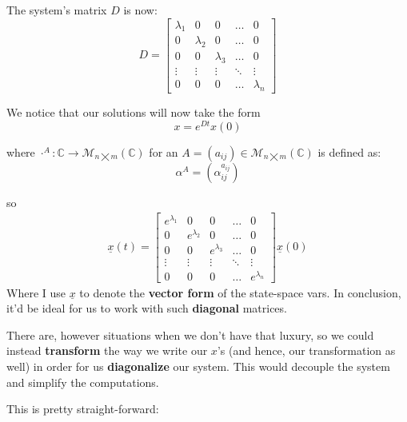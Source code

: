 The system's matrix $D$ is now:
\begin{equation*}
	D =
	\begin{bmatrix}
		\lambda_1 & 0         & 0         & \dots  & 0         \\
		0         & \lambda_2 & 0         & \dots  & 0         \\
		0         & 0         & \lambda_3 & \dots  & 0         \\
		\vdots    & \vdots    & \vdots    & \ddots & \vdots    \\
		0         & 0         & 0         & \dots  & \lambda_n
	\end{bmatrix}
\end{equation*}

We notice that our solutions will now take the form
\[
	x = e^{Dt}x(0)
\]

where $\cdot^A : \mathbb{C} \rightarrow \mathcal{M}_{n \bigtimes m}(\mathbb{C})$ for an $A = (a_{ij}) \in \mathcal{M}_{n \bigtimes m}(\mathbb{C})$ is defined as:
\[
	\alpha^A = (\alpha^{a_{ij}}_{ij})
\]

so
\begin{align*}
	\underline{x}(t) =
	\begin{bmatrix}
		e^{\lambda_1} & 0             & 0             & \dots  & 0             \\
		0             & e^{\lambda_2} & 0             & \dots  & 0             \\
		0             & 0             & e^{\lambda_3} & \dots  & 0             \\
		\vdots        & \vdots        & \vdots        & \ddots & \vdots        \\
		0             & 0             & 0             & \dots  & e^{\lambda_n}
	\end{bmatrix}
	\underline{x}(0)
\end{align*}
Where I use $\underline{x}$ to denote the \textbf{vector form} of the state-space vars.
In conclusion, it'd be ideal for us to work with such \textbf{diagonal} matrices.

There are, however situations when we don't have that luxury, so we could instead \textbf{transform} the way we write our $x$'s (and hence, our transformation as well) in order for us \textbf{diagonalize} our system. This would decouple the system and simplify the computations.

This is pretty straight-forward:

